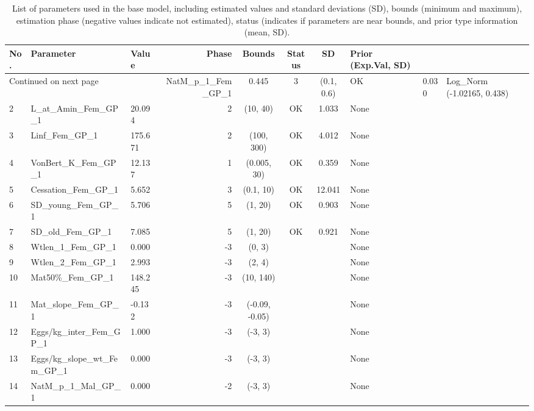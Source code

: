 \documentclass[12pt,]{article}
\begin{document}
\begin{landscape}
\begin{longtable}{lp{2.5in}lrcccl}
\caption{List of parameters used in
                                              the base model, including estimated 
                                              values and standard deviations (SD), 
                                              bounds (minimum and maximum), 
                                              estimation phase (negative values indicate
                                              not estimated), status (indicates if 
                                              parameters are near bounds, and prior type
                                              information (mean, SD).} \\ 
  \hline
No. & Parameter & Value & Phase & Bounds & Status & SD & Prior (Exp.Val, SD)  \\ 
  \hline 
\endhead 
\hline 
\multicolumn{3}{l}{\footnotesize Continued on next page} 
\endfoot 
\endlastfoot 
 \hline
1 & NatM\_p\_1\_Fem\_GP\_1 & 0.445 & 3 & (0.1, 0.6) & OK & 0.030 & Log\_Norm (-1.02165, 0.438) \\ 
  2 & L\_at\_Amin\_Fem\_GP\_1 & 20.094 & 2 & (10, 40) & OK & 1.033 & None \\ 
  3 & Linf\_Fem\_GP\_1 & 175.671 & 2 & (100, 300) & OK & 4.012 & None \\ 
  4 & VonBert\_K\_Fem\_GP\_1 & 12.137 & 1 & (0.005, 30) & OK & 0.359 & None \\ 
  5 & Cessation\_Fem\_GP\_1 & 5.652 & 3 & (0.1, 10) & OK & 12.041 & None \\ 
  6 & SD\_young\_Fem\_GP\_1 & 5.706 & 5 & (1, 20) & OK & 0.903 & None \\ 
  7 & SD\_old\_Fem\_GP\_1 & 7.085 & 5 & (1, 20) & OK & 0.921 & None \\ 
  8 & Wtlen\_1\_Fem\_GP\_1 & 0.000 & -3 & (0, 3) &  &  & None \\ 
  9 & Wtlen\_2\_Fem\_GP\_1 & 2.993 & -3 & (2, 4) &  &  & None \\ 
  10 & Mat50\%\_Fem\_GP\_1 & 148.245 & -3 & (10, 140) &  &  & None \\ 
  11 & Mat\_slope\_Fem\_GP\_1 & -0.132 & -3 & (-0.09, -0.05) &  &  & None \\ 
  12 & Eggs/kg\_inter\_Fem\_GP\_1 & 1.000 & -3 & (-3, 3) &  &  & None \\ 
  13 & Eggs/kg\_slope\_wt\_Fem\_GP\_1 & 0.000 & -3 & (-3, 3) &  &  & None \\ 
  14 & NatM\_p\_1\_Mal\_GP\_1 & 0.000 & -2 & (-3, 3) &  &  & None \\ 

\end{longtable}
\end{landscape}
\end{document}
